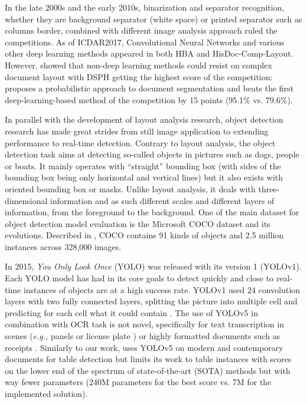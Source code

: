 \documentclass{jdmdh}
\begin{document}
In the late 2000s and the early 2010s, binarization and separator recognition, whether they are background separator (white space) or printed separator such as columns border, combined with different image analysis approach ruled the competitions. As of ICDAR2017, Convolutional Neural Networks and various other deep learning methods appeared in both HBA and HisDoc-Comp-Layout. However, \citet{antonacopoulos2009icdar} showed that non-deep learning methods could resist on complex document layout with DSPH getting the highest score of the competition: \citet{lu2021probabilistic} proposes a probabilistic approach to document segmentation and beats the first deep-learning-based method of the competition by 15 points (95.1\% vs. 79.6\%).

In parallel with the development of layout analysis research, object detection research has made great strides from still image application to extending performance to real-time detection. Contrary to layout analysis, the object detection task aims at detecting so-called objects in pictures such as dogs, people or boats. It mainly operates with ``straight'' bounding box (with sides of the bounding box being only horizontal and vertical lines) but it also exists with oriented bounding box or masks. Unlike layout analysis, it deals with three-dimensional information and as such different scales and different layers of information, from the foreground to the background. One of the main dataset for object detection model evaluation is the Microsoft COCO dataset and its evolutions. Described in \citet{lin2014microsoft}, COCO contains 91 kinds of objects and 2.5 million instances across 328,000 images.

In 2015, \textit{You Only Look Once} (YOLO) was released with its version 1 (YOLOv1). Each YOLO model has had in its core goals to detect quickly and close to real-time instances of objects are at a high success rate. YOLOv1 used 24 convolution layers with two fully connected layers, splitting the picture into multiple cell and predicting for each cell what it could contain \citep{jiang2022a}. The use of YOLOv5 \citep{jocher2022ultralytics} in combination with OCR task is not novel, specifically for text transcription in scenes (\textit{e.g., }panels or license plate \citep{raj2022license}) or highly formatted documents such as receipts \citep{lin2022automatic}. Similarly to our work, \citet{ning2021mt} uses YOLOv5 on modern and contemporary documents for table detection but limits its work to table instances with scores on the lower end of the spectrum of state-of-the-art (SOTA) methods but with way fewer parameters (240M parameters for the best score vs. 7M for the implemented solution).
\end{document}
